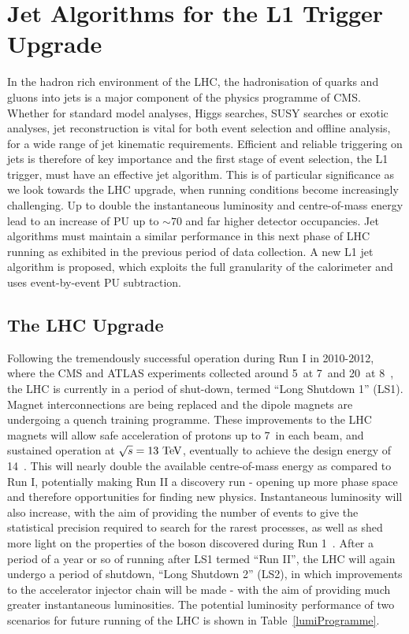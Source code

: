 \chapter{Jet Algorithms for the L1 Trigger Upgrade}
\label{chap:l1jets}

In the  hadron rich environment of the \ac{LHC}, the hadronisation of quarks and gluons into jets is a major component of the physics programme of \ac{CMS}. 
Whether for standard model analyses, Higgs searches, \ac{SUSY} searches or exotic analyses,
jet reconstruction is vital for both event selection and offline analysis, for a wide range of jet kinematic requirements.
Efficient and reliable triggering on jets is therefore of key importance
and the first stage of event selection, the \ac{L1} trigger, must have an effective jet algorithm.
This is of particular significance as we look towards the \ac{LHC} upgrade, when running conditions become increasingly challenging. 
Up to double the instantaneous luminosity and centre-of-mass energy lead to an increase of \ac{PU} up to $\sim 70$ and far higher detector occupancies.
Jet algorithms must maintain a similar performance in this next phase of \ac{LHC} running as exhibited in the previous period of data collection.
A new L1 jet algorithm is proposed, which exploits the full granularity of the calorimeter and uses event-by-event \ac{PU} subtraction. 

\section{The LHC Upgrade\label{sec:LHCupgrade}}

Following the tremendously successful operation during Run I in 2010-2012, where the \ac{CMS} and \ac{ATLAS}
experiments collected around 5~\fbinv at 7~\TeV and 20~\fbinv at 8~\TeV,
the \ac{LHC} is currently in a period of shut-down, termed ``Long Shutdown 1'' (LS1). 
Magnet interconnections are being replaced and the dipole magnets are undergoing a quench training programme. 
These improvements to the \ac{LHC} magnets will allow safe acceleration of protons up to 7~\TeV in each beam, and sustained operation at $\sqrt{s}=13~\mathrm{TeV}$, eventually to achieve the design energy of 14~\TeV.
This will nearly double the available centre-of-mass energy as compared to Run I, potentially making Run II a discovery run - opening up more phase space and therefore opportunities for finding new physics.
Instantaneous luminosity will also increase, with the aim of providing the number of events to give the statistical precision required to search for the rarest processes, as well as shed more light on the properties of the boson discovered during Run 1~\cite{Aad:2012tfa,Chatrchyan:2012ufa,HiggsEvidence}. 
After a period of a year or so of running after LS1 termed ``Run II'', the \ac{LHC} will again undergo a period of shutdown, 
``Long Shutdown 2'' (LS2), in which improvements to the accelerator injector chain will be made - with the aim of providing much greater instantaneous luminosities. 
The potential luminosity performance of two scenarios for future running of the \ac{LHC} is shown in Table~\ref{lumiProgramme}. 

